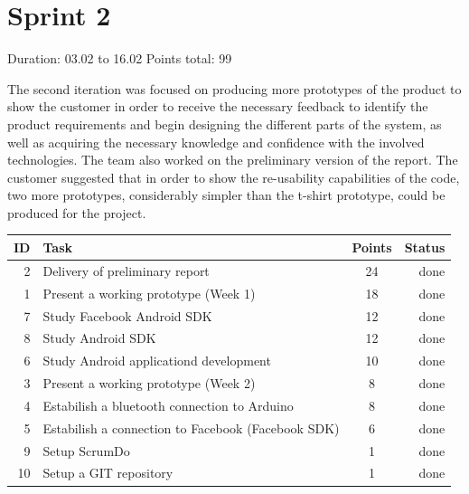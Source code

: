 \newpage


\section{Sprint 2}

Duration: 03.02 to 16.02
Points total: 99

The second iteration was focused on producing more prototypes of the product to
show the customer in order to receive the necessary feedback to identify
the product requirements and begin designing the different parts of the system,
as well as acquiring the necessary knowledge and confidence with the involved
technologies. The team also worked on the preliminary version of the report.
The customer suggested that in order to show the re-usability capabilities of
the code, two more prototypes, considerably simpler than the t-shirt prototype,
could be produced for the project.

\begin{table}[ht!]
\begin{tabular}{ | r | l | c | r | }

\hline
\textbf{ID} & \textbf{Task} & \textbf{Points} & \textbf{Status} \\
\hline

 2 & Delivery of preliminary report					& 24 & done \\
\hline
 1 & Present a working prototype (Week 1)			& 18 & done \\
\hline
 7 & Study Facebook Android SDK						& 12 & done \\
\hline
 8 & Study Android SDK								& 12 & done \\
\hline
 6 & Study Android applicationd development			& 10 & done \\
\hline
 3 & Present a working prototype (Week 2)			& 8  & done \\
\hline
 4 & Estabilish a bluetooth connection to Arduino	& 8  & done \\
\hline
 5 & Estabilish a connection to Facebook
(Facebook SDK)										& 6  & done \\
\hline
 9 & Setup ScrumDo									& 1  & done \\
\hline
 10 & Setup a GIT repository                         & 1  & done \\
\hline

\end{tabular}
\end{table}


